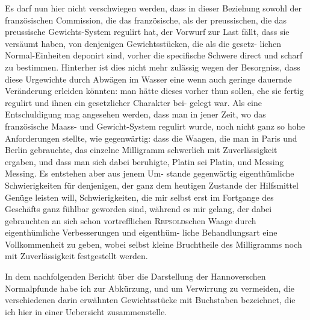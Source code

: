 \documentclass[12pt,a4paper]{article}
\theoremstyle{plain}
\theoremstyle{definition}
\theoremstyle{remark}
\begin{document}
Es darf nun hier nicht verschwiegen werden, dass in dieser Beziehung
sowohl der franz\"osischen Commission, die das franz\"osische, als der preussischen,
die das preussische Gewichts-System regulirt hat, der Vorwurf zur Last f\"allt,
dass sie vers\"aumt haben, von denjenigen Gewichtsst\"ucken, die als die gesetz-
lichen Normal-Einheiten deponirt sind, vorher die specifische Schwere direct
und scharf zu bestimmen. Hinterher ist dies nicht mehr zul\"assig wegen der
Besorgniss, dass diese Urgewichte durch Abw\"agen im Wasser eine wenn auch
geringe dauernde Ver\"anderung erleiden k\"onnten: man h\"atte dieses vorher
thun sollen, ehe sie fertig regulirt und ihnen ein gesetzlicher Charakter bei-
gelegt war. Als eine Entschuldigung mag angesehen werden, dass man in
jener Zeit, wo das franz\"osische Maass- und Gewicht-System regulirt wurde,
noch nicht ganz so hohe Anforderungen stellte, wie gegenw\"artig: dass die
Waagen, die man in Paris und Berlin gebrauchte, das einzelne Milligramm
schwerlich mit Zuverl\"assigkeit ergaben, und dass man sich dabei beruhigte,
Platin sei Platin, und Messing Messing. Es entstehen aber aus jenem Um-
stande gegenw\"artig eigenth\"umliche Schwierigkeiten f\"ur denjenigen, der ganz
dem heutigen Zustande der Hilfsmittel Gen\"uge leisten will, Schwierigkeiten,
die mir selbst erst im Fortgange des Gesch\"afts ganz f\"uhlbar geworden sind,
w\"ahrend es mir gelang, der dabei gebrauchten an sich schon vortrefflichen
\textsc{Repsold}schen Waage durch eigenth\"umliche Verbesserungen und eigenth\"um-
liche Behandlungsart eine Vollkommenheit zu geben, wobei selbst kleine
Bruchtheile des Milligramms noch mit Zuverl\"assigkeit festgestellt werden.

In dem nachfolgenden Bericht \"uber die Darstellung der Hannoverschen
Normalpfunde habe ich zur Abk\"urzung, und um Verwirrung zu vermeiden,
die verschiedenen darin erw\"ahnten Gewichtsst\"ucke mit Buchstaben bezeichnet,
die ich hier in einer Uebersicht zusammenstelle.
\end{document}
